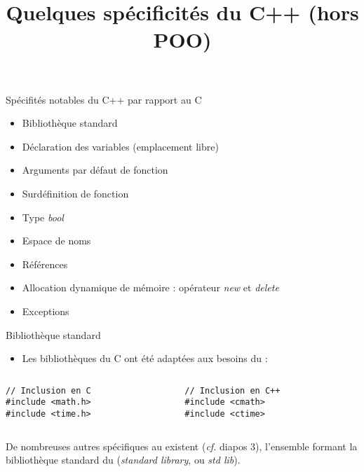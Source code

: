 \documentclass[c]{beamer}
\title{Quelques spécificités du C++ (hors POO)}
\begin{document}
\maketitle
\def\theFancyVerbLine{%
  \color{white}\sffamily\tiny\arabic{FancyVerbLine}%
        {\tikz[remember picture,overlay]\node(minted-\arabic{FancyVerbLine}){};}%
}


\begin{frame}[fragile]{Spécifités notables du C++ par rapport au C}
  \begin{itemize}  
  \item Bibliothèque standard
  \item Déclaration des variables (emplacement libre)
  \item Arguments par défaut de fonction
  \item Surdéfinition de fonction
  \item Type \textit{bool}
  \item Espace de noms
  \item Références
  \item Allocation dynamique de mémoire : opérateur \textit{new} et \textit{delete}
  \item Exceptions
  \end{itemize}
\end{frame}


\begin{frame}[fragile]{Bibliothèque standard}
\begin{itemize}
\item Les bibliothèques du C ont été adaptées aux besoins du \Cpp :
\end{itemize}

\begin{columns}
\begin{column}{0.3\columnwidth}
\begin{verbatim}
// Inclusion en C
#include <math.h>
#include <time.h>
\end{verbatim}
\end{column}

\begin{column}{0.4\columnwidth}
\begin{verbatim}
// Inclusion en C++
#include <cmath>
#include <ctime>
\end{verbatim}
\end{column}
\end{columns}

\vspace{3em}
De nombreuses autres spécifiques au \Cpp existent (\textit{cf.} diapos 3), l'ensemble formant la bibliothèque standard du \Cpp (\textit{standard library}, ou \textit{std lib}).

\end{frame}
\end{document}
